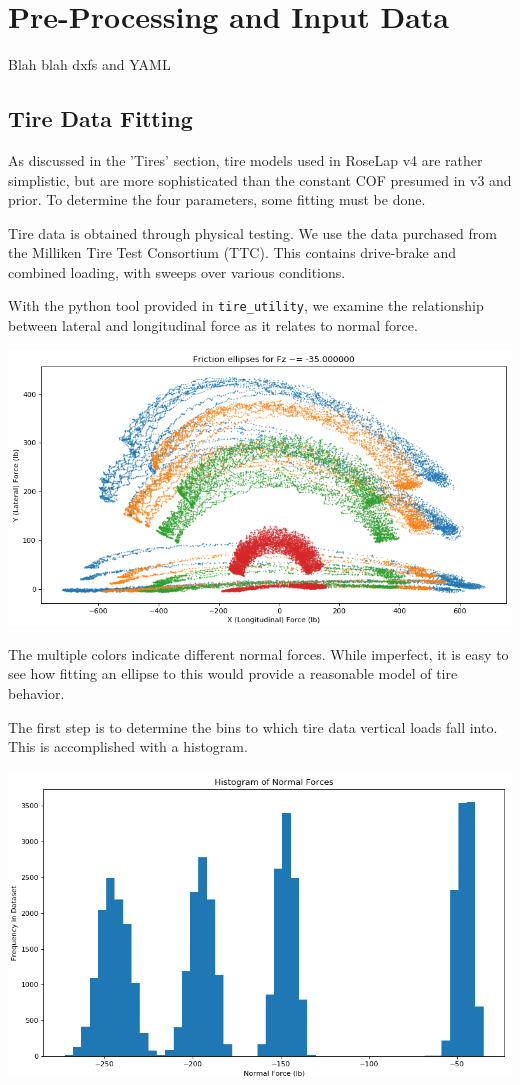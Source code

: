 \documentclass{article}
\begin{document}
\section{Pre-Processing and Input Data}
Blah blah dxfs and YAML

\subsection{Tire Data Fitting}
As discussed in the 'Tires' section, tire models used in RoseLap v4 are rather simplistic, but are more sophisticated than the constant COF presumed in v3 and prior. To determine the four parameters, some fitting must be done.

Tire data is obtained through physical testing. We use the data purchased from the Milliken Tire Test Consortium (TTC). This contains drive-brake and combined loading, with sweeps over various conditions.

With the python tool provided in \texttt{tire\_utility}, we examine the relationship between lateral and longitudinal force as it relates to normal force.

\includegraphics[width=\textwidth]{fric_ellipses.png}

The multiple colors indicate different normal forces. While imperfect, it is easy to see how fitting an ellipse to this would provide a reasonable model of tire behavior.

The first step is to determine the bins to which tire data vertical loads fall into. This is accomplished with a histogram.

\includegraphics[width=\textwidth]{fric_hist.png}
\end{document}
